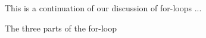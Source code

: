 \newpage{}

This is a continuation of our discussion of for-loops ...

The three parts of the for-loop














         








